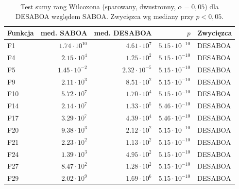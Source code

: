 \begin{table}[H]
\centering
\caption{Test sumy rang Wilcoxona (sparowany, dwustronny, $\alpha=0{,}05$) dla DESABOA względem SABOA. Zwycięzca wg mediany przy $p<0{,}05$.}
\label{tab:wilcoxon}
\begin{tabular}{lrrrl}
\toprule
\textbf{Funkcja} & \textbf{med. SABOA} & \textbf{med. DESABOA} & \textbf{$p$} & \textbf{Zwycięzca} \\
\midrule
F1 & $1.74\cdot10^{10}$ & $4.61\cdot10^{7}$ & $5.15\cdot10^{-10}$ & DESABOA \\
F4 & $2.15\cdot10^{4}$ & $1.25\cdot10^{2}$ & $5.15\cdot10^{-10}$ & DESABOA \\
F5 & $1.45\cdot10^{-2}$ & $2.32\cdot10^{-5}$ & $5.15\cdot10^{-10}$ & DESABOA \\
F9 & $2.11\cdot10^{3}$ & $8.51\cdot10^{2}$ & $5.15\cdot10^{-10}$ & DESABOA \\
F10 & $5.72\cdot10^{7}$ & $1.70\cdot10^{4}$ & $5.15\cdot10^{-10}$ & DESABOA \\
F14 & $2.14\cdot10^{7}$ & $1.33\cdot10^{5}$ & $5.46\cdot10^{-10}$ & DESABOA \\
F17 & $3.29\cdot10^{7}$ & $4.39\cdot10^{4}$ & $5.46\cdot10^{-10}$ & DESABOA \\
F20 & $9.38\cdot10^{3}$ & $2.12\cdot10^{2}$ & $5.15\cdot10^{-10}$ & DESABOA \\
F21 & $2.23\cdot10^{2}$ & $1.13\cdot10^{2}$ & $5.15\cdot10^{-10}$ & DESABOA \\
F24 & $1.39\cdot10^{3}$ & $4.95\cdot10^{2}$ & $5.15\cdot10^{-10}$ & DESABOA \\
F27 & $8.47\cdot10^{2}$ & $1.28\cdot10^{2}$ & $5.15\cdot10^{-10}$ & DESABOA \\
F29 & $2.02\cdot10^{9}$ & $1.69\cdot10^{6}$ & $5.15\cdot10^{-10}$ & DESABOA \\
\bottomrule
\end{tabular}
\end{table}
